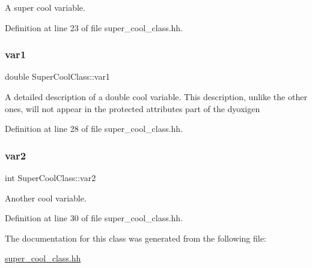 A super cool variable. 



Definition at line 23 of file super\+\_\+cool\+\_\+class.\+hh.

\mbox{\label{class_super_cool_class_a0cd88b6d83d78b0f2988647f09b28d89}} 
\subsubsection{\texorpdfstring{var1}{var1}}
{\footnotesize\ttfamily double Super\+Cool\+Class\+::var1\hspace{0.3cm}{\ttfamily [protected]}}

A detailed description of a double cool variable. This description, unlike the other ones, will not appear in the protected attributes part of the dyoxigen 

Definition at line 28 of file super\+\_\+cool\+\_\+class.\+hh.

\mbox{\label{class_super_cool_class_a3aab6b04514bbac39bccd961b2ad470e}} 
\subsubsection{\texorpdfstring{var2}{var2}}
{\footnotesize\ttfamily int Super\+Cool\+Class\+::var2\hspace{0.3cm}{\ttfamily [protected]}}



Another cool variable. 



Definition at line 30 of file super\+\_\+cool\+\_\+class.\+hh.



The documentation for this class was generated from the following file\+:\begin{DoxyCompactItemize}
\item 
\hyperlink{super__cool__class_8hh}{super\+\_\+cool\+\_\+class.\+hh}\end{DoxyCompactItemize}
